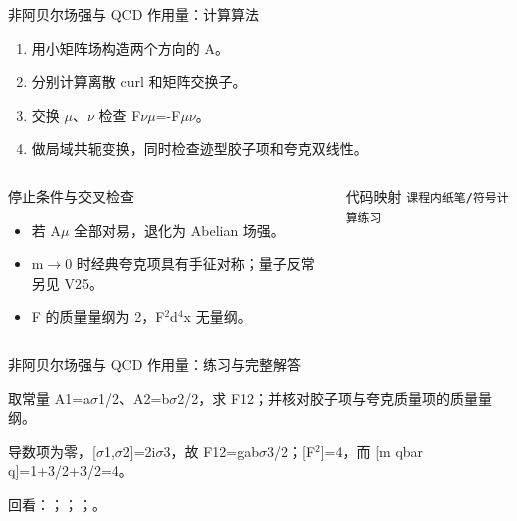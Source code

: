 \begin{frame}[t]{非阿贝尔场强与 QCD 作用量：计算算法}
\footnotesize
{}\begin{enumerate}
\item 用小矩阵场构造两个方向的 A。
\item 分别计算离散 curl 和矩阵交换子。
\item 交换 \ensuremath{\mu}、\ensuremath{\nu} 检查 F\ensuremath{\nu}\ensuremath{\mu}=-F\ensuremath{\mu}\ensuremath{\nu}。
\item 做局域共轭变换，同时检查迹型胶子项和夸克双线性。
\end{enumerate}\begin{columns}[T,onlytextwidth]
\begin{block}{停止条件与交叉检查}\scriptsize\begin{itemize}
\item[\CheckMark] 若 A\ensuremath{\mu} 全部对易，退化为 Abelian 场强。
\item[\CheckMark] m\ensuremath{\rightarrow}0 时经典夸克项具有手征对称；量子反常另见 V25。
\item[\CheckMark] F 的质量量纲为 2，F\ensuremath{^{2}}d\ensuremath{^{4}}x 无量纲。
\end{itemize}\end{block}
\begin{block}{代码映射}
\scriptsize \texttt{课程内纸笔/\allowbreak{}符号计算练习}
\end{block}\end{columns}\end{frame}

\begin{frame}[t]{非阿贝尔场强与 QCD 作用量：练习与完整解答}
\footnotesize
\begin{block}{}取常量 A1=a\ensuremath{\sigma}1/\allowbreak{}2、A2=b\ensuremath{\sigma}2/\allowbreak{}2，求 F12；并核对胶子项与夸克质量项的质量量纲。\end{block}
\begin{exampleblock}{}导数项为零，[\ensuremath{\sigma}1,\ensuremath{\sigma}2]=2i\ensuremath{\sigma}3，故 F12=gab\ensuremath{\sigma}3/\allowbreak{}2；[F\ensuremath{^{2}}]=4，而 [m qbar q]=1+3/\allowbreak{}2+3/\allowbreak{}2=4。\end{exampleblock}
\vfill
\scriptsize 回看：；；；。
\end{frame}

